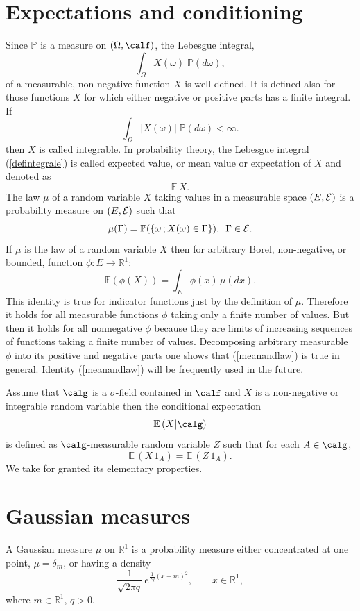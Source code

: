\documentclass[preprint]{imsart}
\def\P{\mathbb P}
\def\E{\mathbb E}
\def\R{\mathbb R}
\begin{document}
{\section{Expectations and conditioning}

Since $\P$ is a measure on $(\Omega, \calf)$, the Lebesgue
integral,
\begin{equation}\label{defintegrale}
  \int_\Omega X(\omega)\; \P (d\omega),
\end{equation}
of a measurable, non-negative function $X$ is well defined. It is defined also for those functions $X$ for which
either negative or positive parts has a finite integral. If
$$
  \int_\Omega |X(\omega)|\; \P (d\omega)<\infty.
$$
then $X$ is called integrable.
In probability theory,
the Lebesgue integral (\ref{defintegrale}) is called
expected value, or mean value or expectation of $X$ and denoted as
$$
\E\, X.
$$
The law $\mu$ of a random variable $X$ taking values in a measurable space $(E, \cal E)$ is a probability measure on
$(E, \cal E)$ such that
$$
\mu (\Gamma) = \P (\{\omega\,; X(\omega)\in \Gamma\}),\,\,\,\Gamma \in \cal E.
$$
If $\mu$ is the law of a random variable $X$
then for arbitrary Borel, non-negative, or bounded,  function $\phi:E\to\R^1$:
\begin{equation}\label{meanandlaw}
\E(\phi(X))=\int_E\phi(x)\, \mu(dx).
\end{equation}
This identity is true for indicator functions
just by the definition of $\mu$.
Therefore it holds for all measurable functions $\phi$
taking only a finite number of values. But then it
holds for all nonnegative $\phi$ because they are
limits of increasing sequences of functions taking a
finite number of values. Decomposing arbitrary
measurable $\phi$ into its positive and negative parts
one shows that (\ref{meanandlaw}) is true in general.
Identity  (\ref{meanandlaw}) will be frequently used in
the future.

Assume that $\calg$ is a $\sigma$-field contained in $\calf$ and
$X$ is a non-negative or integrable random variable then the
conditional expectation
$$
\E\, (X|\calg)
$$
is defined as  $\calg$-measurable random variable $Z$ such that for each
$A\in\calg$,
$$
\E\, (X\, 1_A) =\E\, (Z\, 1_A).
$$
We take for granted its elementary properties.


\section{Gaussian measures}

A Gaussian measure $\mu$ on $\R^1$ is a probability measure
either concentrated at one point, $\mu=\delta_m$, or having a
density
$$
\frac{1}{\sqrt{2\pi q}}\, e^{\frac{1}{2q}(x-m)^2},
\qquad x\in \R^1,
$$
where $m\in\R^1$, $q>0$.

}
\end{document}
